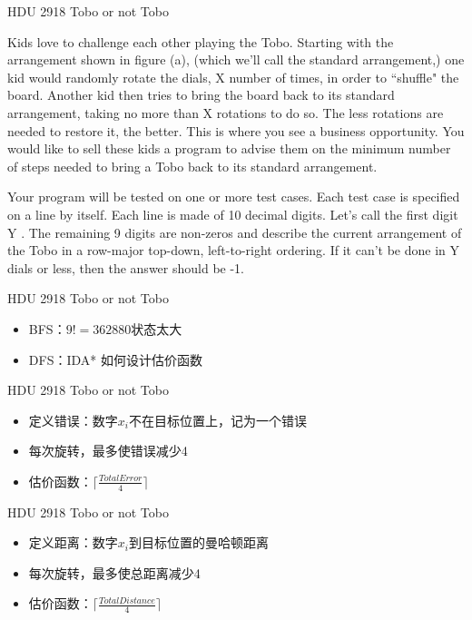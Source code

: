 \documentclass{beamer}
\begin{document}
\begin{frame}{HDU 2918 Tobo or not Tobo}

    Kids love to challenge each other playing the Tobo. Starting with the arrangement shown in figure (a), (which we'll call the standard arrangement,) one kid would randomly rotate the dials, X number of times, in order to ``shuffle" the board. Another kid then tries to bring the board back to its standard arrangement, taking no more than X rotations to do so. The less rotations are needed to restore it, the better. This is where you see a business opportunity. You would like to sell these kids a program to advise them on the minimum number of steps needed to bring a Tobo back to its standard arrangement.
    
    Your program will be tested on one or more test cases. Each test case is specified on a line by itself. Each line is made of 10 decimal digits. Let's call the first digit Y . The remaining 9 digits are non-zeros and describe the current arrangement of the Tobo in a row-major top-down, left-to-right ordering. If it can't be done in Y dials or less, then the answer should be -1.
    
\end{frame}

\begin{frame}{HDU 2918 Tobo or not Tobo}
    
    \begin{itemize}
        \item BFS：$9!=362880$状态太大
        \item DFS：IDA* 如何设计估价函数
    \end{itemize}
    
\end{frame}

\begin{frame}{HDU 2918 Tobo or not Tobo}
    
    \begin{itemize}
        \item 定义错误：数字$x_i$不在目标位置上，记为一个错误
        \item 每次旋转，最多使错误减少4
        \item 估价函数：$\lceil\frac{TotalError}{4}\rceil$
    \end{itemize}
    
\end{frame}

\begin{frame}{HDU 2918 Tobo or not Tobo}
    
    \begin{itemize}
        \item 定义距离：数字$x_i$到目标位置的曼哈顿距离
        \item 每次旋转，最多使总距离减少4
        \item 估价函数：$\lceil\frac{TotalDistance}{4}\rceil$
    \end{itemize}
    
\end{frame}
\end{document}
